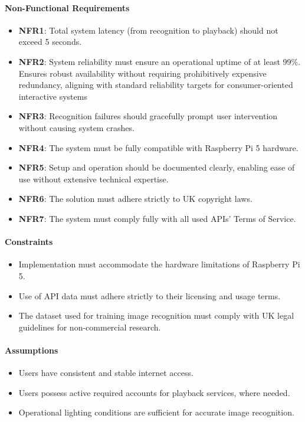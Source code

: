             \paragraph{Non-Functional Requirements}
                \begin{itemize}
                    \item \textbf{NFR1}: Total system latency (from recognition to playback) should not exceed 5 seconds.
                    \item \textbf{NFR2}: System reliability must ensure an operational uptime of at least 99\%. Ensures robust availability without requiring prohibitively expensive redundancy, aligning with standard reliability targets for consumer-oriented interactive systems
                    \item \textbf{NFR3}: Recognition failures should gracefully prompt user intervention without causing system crashes.
                    \item \textbf{NFR4}: The system must be fully compatible with Raspberry Pi 5 hardware.
                    \item \textbf{NFR5}: Setup and operation should be documented clearly, enabling ease of use without extensive technical expertise.
                    \item \textbf{NFR6}: The solution must adhere strictly to UK copyright laws.
                    \item \textbf{NFR7}: The system must comply fully with all used APIs' Terms of Service.
                \end{itemize}
            
            \paragraph{Constraints}
                \begin{itemize}
                    \item Implementation must accommodate the hardware limitations of Raspberry Pi 5.
                    \item Use of API data must adhere strictly to their licensing and usage terms.
                    \item The dataset used for training image recognition must comply with UK legal guidelines for non-commercial research.
                \end{itemize}
            
            \paragraph{Assumptions}
                \begin{itemize}
                    \item Users have consistent and stable internet access.
                    \item Users possess active required accounts for playback services, where needed.
                    \item Operational lighting conditions are sufficient for accurate image recognition.
                \end{itemize}
    
